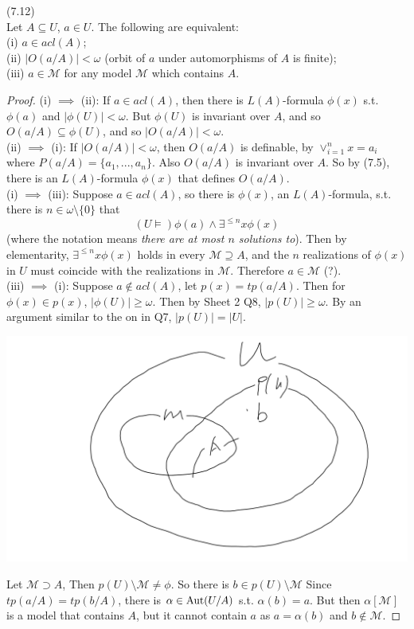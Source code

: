 \documentclass[a4paper]{article}
\begin{document}
\begin{thm} (7.12)\\
    Let $A \subseteq U$, $a \in U$. The following are equivalent:\\
    (i) $a \in acl(A)$;\\
    (ii) $|O(a/A)| < \omega$ (orbit of $a$ under automorphisms of $A$ is finite);\\
    (iii) $a \in \mathcal{M}$ for any model $\mathcal{M}$ which contains $A$.
    \begin{proof}
        (i) $\implies$ (ii): If $a \in acl(A)$, then there is $L(A)$-formula $\phi(x)$ s.t. $\phi(a)$ and $|\phi(U)| < \omega$. But $\phi(U)$ is invariant over $A$, and so $O(a/A) \subseteq \phi(U)$, and so $|O(a/A)| < \omega$.\\
        (ii) $\implies$ (i): If $|O(a/A)| < \omega$, then $O(a/A)$ is definable, by $\vee_{i=1}^n x=a_i$ where $P(a/A) = \{a_1,...,a_n\}$. Also $O(a/A)$ is invariant over $A$. So by (7.5), there is an $L(A)$-formula $\phi(x)$ that defines $O(a/A)$.\\
        (i) $\implies$ (iii): Suppose $a \in acl(A)$, so there is $\phi(x)$, an $L(A)$-formula, s.t. there is $n \in \omega \setminus \{0\}$ that
        $$ (U\vDash) \phi(a) \wedge \exists^{\leq n} x \phi(x)$$
        (where the notation means \emph{there are at most $n$ solutions to}). Then by elementarity, $\exists^{\leq n} x \phi(x)$ holds in every $\mathcal{M} \supseteq A$, and the $n$ realizations of $\phi(x)$ in $U$ must coincide with the realizations in $\mathcal{M}$. Therefore $a \in \mathcal{M}$ (?).\\
        (iii) $\implies$ (i): Suppose $a \not\in acl(A)$, let $p(x) = tp(a/A)$. Then for $\phi(x) \in p(x)$, $|\phi(U)| \geq \omega$. Then by Sheet 2 Q8, $|p(U)| \geq \omega$. By an argument similar to the on in Q7, $|p(U)| = |U|$.

        \includegraphics[scale=0.5]{image/Model_12.png}

        Let $\mathcal{M} \supset A$, Then $p(U) \setminus \mathcal{M} \neq \phi$. So there is $b \in p(U) \setminus \mathcal{M}$ Since $tp(a/A) = tp(b/A)$, there is $\alpha \in \operatorname{Aut}(U/A)$ s.t. $\alpha(b) = a$. But then $\alpha[\mathcal{M}]$ is a model that contains $A$, but it cannot contain $a$ as $a = \alpha(b)$ and $b \not\in \mathcal{M}$.
    \end{proof}
\end{thm}
\end{document}

